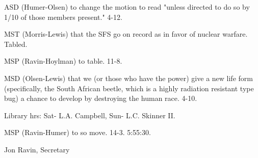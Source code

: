 \documentclass[12pt]{article}
\begin{document}
ASD (Humer-Olsen) to change the motion to read "unless directed to do so by 1/10 of those members present." 4-12.

MST (Morris-Lewis) that the SFS go on record as in favor of nuclear warfare. Tabled.

MSP (Ravin-Hoylman) to table. 11-8.

MSD (Olsen-Lewis) that we (or those who have the power) give a new life form (specifically, the South African beetle, which is a highly radiation resistant type bug) a chance to develop by destroying the human race. 4-10.

Library hrs: Sat- L.A. Campbell, Sun- L.C. Skinner II.

MSP (Ravin-Humer) to so move. 14-3. 5:55:30.

\vspace{12pt}

\centerline{Jon Ravin, Secretary}
\end{document}

